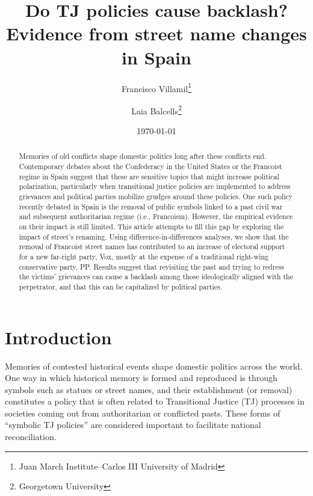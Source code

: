 \documentclass[12pt, notitlepage]{article}
\title{\Large Do TJ policies cause backlash?\\Evidence from street name changes in Spain}
\author{Francisco Villamil\footnote{Juan March Institute--Carlos III University of Madrid} \and Laia Balcells\footnote{Georgetown University}}
\date{\today}
\begin{document}
\maketitle

\begin{abstract}
Memories of old conflicts shape domestic politics long after these conflicts end. Contemporary debates about the Confederacy in the United States or the Francoist regime in Spain suggest that these are sensitive topics that might increase political polarization, particularly when transitional justice policies are implemented to address grievances and political parties mobilize grudges around these policies. One such policy recently debated in Spain is the removal of public symbols linked to a past civil war and subsequent authoritarian regime (i.e., Francoism). However, the empirical evidence on their impact is still limited. This article attempts to fill this gap by exploring the impact of street's renaming. Using difference-in-differences analyses, we show that the removal of Francoist street names has contributed to an increase of electoral support for a new far-right party, Vox, mostly at the expense of a traditional right-wing conservative party, PP. Results suggest that revisiting the past and trying to redress the victims' grievances can cause a backlash among those ideologically aligned with the perpetrator, and that this can be capitalized by political parties.

\vspace{10pt}
\noindent

\end{abstract}

\newpage
\section*{Introduction}

Memories of contested historical events shape domestic politics across the world. One way in which historical memory is formed and reproduced is through symbols such as statues or street names, and their establishment (or removal) constitutes a policy that is often related to Transitional Justice (TJ) processes in societies coming out from authoritarian or conflicted pasts. These forms of ``symbolic TJ policies'' are considered important to facilitate national reconciliation.

\end{document}
